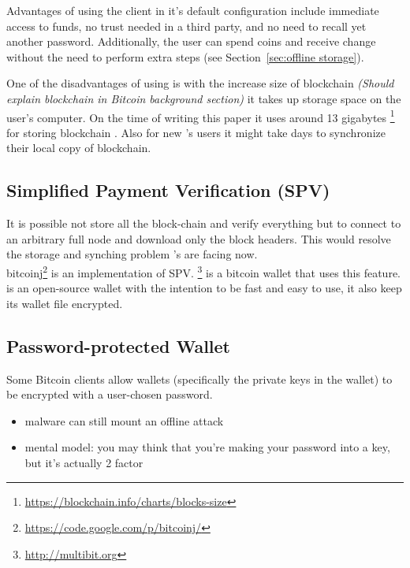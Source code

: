 Advantages of using the \bitcoinclient client in it's default configuration include immediate access to funds, no trust needed in a third party, and no need to recall yet another password. Additionally, the user can spend coins and receive change without the need to perform extra steps (see Section~\ref{sec:offline storage}). 

One of the disadvantages of using \bitcoinclient is with the increase size of blockchain \textit {(Should explain blockchain in Bitcoin background section)}  it takes up storage space on the user's computer. On the time of writing this paper it uses around 13 gigabytes \footnote{\url{https://blockchain.info/charts/blocks-size}} for storing blockchain . Also for new \bitcoinclient's users it might take days to synchronize their local copy of blockchain.
\subsection{Simplified Payment Verification (SPV)}
It is possible not store all the block-chain and verify everything but to connect to an arbitrary full node and download only the block headers. This would resolve the storage and synching problem \bitcoinclient's are facing now. \\
bitcoinj\footnote{\url {https://code.google.com/p/bitcoinj/}} is an implementation of SPV.
 \multibit \footnote{\url {http://multibit.org}} is a bitcoin wallet that uses this feature. \multibit is an open-source wallet with the intention to be fast and easy to use, it also keep its wallet file encrypted.




\subsection{Password-protected Wallet}
Some Bitcoin clients allow wallets (specifically the private keys in the wallet) to be encrypted with a user-chosen password.
\begin{itemize}
  \item malware can still mount an offline attack
  \item mental model: you may think that you're making your password into a key, but it's actually 2 factor
\end{itemize}

